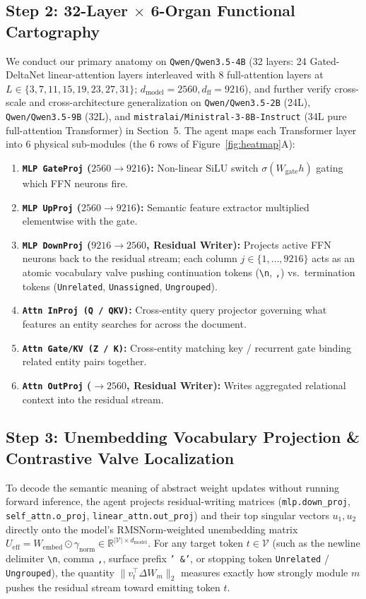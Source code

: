 \documentclass[11pt,a4paper]{article}
\begin{document}
\subsection{Step 2: 32-Layer $\times$ 6-Organ Functional Cartography}
We conduct our primary anatomy on \texttt{Qwen/Qwen3.5-4B} (32 layers: 24 Gated-DeltaNet linear-attention layers interleaved with 8 full-attention layers at $L \in \{3,7,11,15,19,23,27,31\}$; $d_{\text{model}}=2560, d_{\text{ff}}=9216$), and further verify cross-scale and cross-architecture generalization on \texttt{Qwen/Qwen3.5-2B} (24L), \texttt{Qwen/Qwen3.5-9B} (32L), and \texttt{mistralai/Ministral-3-8B-Instruct} (34L pure full-attention Transformer) in Section~5. The agent maps each Transformer layer into 6 physical sub-modules (the 6 rows of Figure~\ref{fig:heatmap}A):
\begin{enumerate}
    \item \textbf{\texttt{MLP GateProj} ($2560 \to 9216$):} Non-linear SiLU switch $\sigma(W_{\text{gate}} h)$ gating which FFN neurons fire.
    \item \textbf{\texttt{MLP UpProj} ($2560 \to 9216$):} Semantic feature extractor multiplied elementwise with the gate.
    \item \textbf{\texttt{MLP DownProj} ($9216 \to 2560$, Residual Writer):} Projects active FFN neurons back to the residual stream; each column $j \in \{1,\dots,9216\}$ acts as an atomic vocabulary valve pushing continuation tokens (\texttt{\textbackslash n}, \texttt{,}) vs.\ termination tokens (\texttt{Unrelated}, \texttt{Unassigned}, \texttt{Ungrouped}).
    \item \textbf{\texttt{Attn InProj (Q / QKV)}:} Cross-entity query projector governing what features an entity searches for across the document.
    \item \textbf{\texttt{Attn Gate/KV (Z / K)}:} Cross-entity matching key / recurrent gate binding related entity pairs together.
    \item \textbf{\texttt{Attn OutProj} ($\to 2560$, Residual Writer):} Writes aggregated relational context into the residual stream.
\end{enumerate}

\subsection{Step 3: Unembedding Vocabulary Projection \& Contrastive Valve Localization}
To decode the semantic meaning of abstract weight updates without running forward inference, the agent projects residual-writing matrices (\texttt{mlp.down\_proj}, \texttt{self\_attn.o\_proj}, \texttt{linear\_attn.out\_proj}) and their top singular vectors $u_1, u_2$ directly onto the model's RMSNorm-weighted unembedding matrix $U_{\text{eff}} = W_{\text{embed}} \odot \gamma_{\text{norm}} \in \mathbb{R}^{|\mathcal{V}| \times d_{\text{model}}}$. For any target token $t \in \mathcal{V}$ (such as the newline delimiter \texttt{\textbackslash n}, comma \texttt{,}, surface prefix \texttt{' \&'}, or stopping token \texttt{Unrelated} / \texttt{Ungrouped}), the quantity $\|v_t^\top \Delta W_m\|_2$ measures exactly how strongly module $m$ pushes the residual stream toward emitting token $t$.
\end{document}
